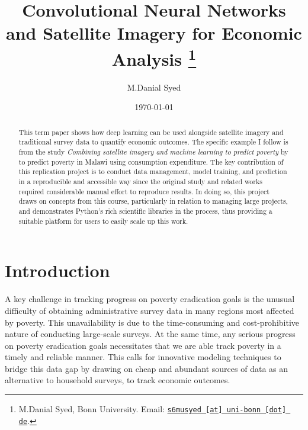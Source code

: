 \documentclass[11pt, a4paper, leqno]{article}
\begin{document}
\title{Convolutional Neural Networks and Satellite Imagery for Economic Analysis \thanks{M.Danial Syed, Bonn University. Email: \href{mailto:s6musyed@uni-bonn.de}{\nolinkurl{s6musyed [at] uni-bonn [dot] de}}.}}

\author{M.Danial Syed}

\date{
    \today
}

\maketitle


\begin{abstract}
 This term paper shows how deep learning can be used alongside satellite imagery and traditional survey data to quantify economic outcomes. The specific example I follow is from the study \textit{Combining satellite imagery and machine learning to predict poverty} by \citet{jean2016combining} to predict poverty in Malawi using consumption expenditure. The key contribution of this replication project is to conduct data management, model training, and prediction in a reproducible and accessible way since the original study and related works required considerable manual effort to reproduce results. In doing so, this project draws on concepts from this course, particularly in relation to managing large projects, and demonstrates Python's rich scientific libraries in the process, thus providing a suitable platform for users to easily scale up this work.
\end{abstract}

\clearpage


\section{Introduction} %
\label{sec:introduction}

A key challenge in tracking progress on poverty eradication goals is the unusual difficulty of obtaining administrative survey data in many regions most affected by poverty. This unavailability is due to the time-consuming and cost-prohibitive nature of conducting large-scale surveys. At the same time, any serious progress on poverty eradication goals necessitates that we are able track poverty in a timely and reliable manner. This calls for innovative modeling techniques to bridge this data gap by drawing on cheap and abundant sources of data as an alternative to household surveys, to track economic outcomes.
\end{document}
